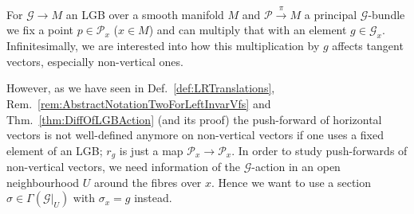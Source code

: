 \documentclass[a4paper,oneside,11pt,bibliography=totoc]{scrartcl}
\theoremstyle{plain}
\theoremstyle{remark}
\theoremstyle{definition}
\begin{document}
\begin{center}
\end{center}

For $\mathcal{G} \to M$ an LGB over a smooth manifold $M$ and $\mathcal{P} \stackrel{\pi}{\to} M$ a principal $\mathcal{G}$-bundle we fix a point $p \in \mathcal{P}_x$ ($x \in M$) and can multiply that with an element $g \in \mathcal{G}_x$. Infinitesimally, we are interested into how this multiplication by $g$ affects tangent vectors, especially non-vertical ones.

However, as we have seen in Def.\ \ref{def:LRTranslations}, Rem.\ \ref{rem:AbstractNotationTwoForLeftInvarVfs} and Thm.\ \ref{thm:DiffOfLGBAction} (and its proof) the push-forward of horizontal vectors is not well-defined anymore on non-vertical vectors if one uses a fixed element of an LGB; $r_g$ is just a map $\mathcal{P}_x \to \mathcal{P}_x$. In order to study push-forwards of non-vertical vectors, we need information of the $\mathcal{G}$-action in an open neighbourhood $U$ around the fibres over $x$. Hence we want to use a section $\sigma \in \Gamma(\mathcal{G}|_U)$ with $\sigma_x= g$ instead.
\end{document}

